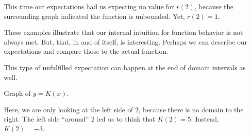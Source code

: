 \documentclass{ximera}
\begin{document}
This time our expectations had us expecting no value for $r(2)$, because the surrounding graph indicated the function is unbounded.  Yet, $r(2) = 1$.



















These examples illustrate that our internal intuition for function behavior is not always met.  But, that, in and of itself, is interesting.  Perhaps we can describe our expectations and compare those to the actual function.







This type of unfulfilled expectation can happen at the end of domain intervals as well.






Graph of $y = K(x)$.

\begin{image}
\end{image}



Here, we are only looking at the left side of $2$, because there is no domain to the right.  The left side ``around'' $2$ led us to think that $K(2) = 5$.  Instead, $K(2) = -3$. \\
\end{document}
